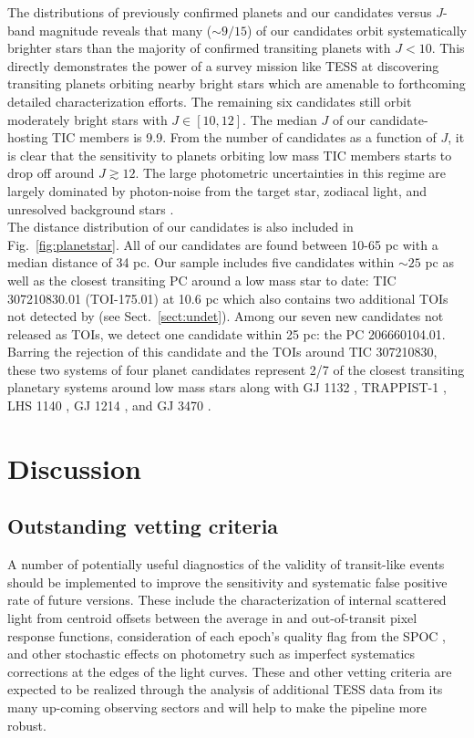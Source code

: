 The distributions of previously confirmed planets
and our candidates versus $J$-band magnitude reveals that many ($\sim 9/15$) of our candidates
orbit systematically brighter stars than the majority of confirmed transiting planets with
$J<10$. This directly demonstrates the power of a survey mission like TESS at discovering
transiting planets orbiting nearby bright stars which are amenable to forthcoming detailed
characterization efforts. The remaining six candidates still orbit moderately
bright stars with $J \in [10,12]$. The median $J$ of our candidate-hosting TIC members is 9.9.
From the number of \pipeline{} candidates as a function of $J$,
it is clear that the \pipeline{} sensitivity to planets orbiting low mass TIC members starts to drop
off around $J \gtrsim 12$.
The large photometric uncertainties in this regime are largely dominated by photon-noise
from the target star, zodiacal light, and unresolved background stars \citep{ricker15}. \\

The distance distribution of our candidates is also included in Fig.~\ref{fig:planetstar}. All of
our candidates are found between 10-65 pc with a median distance of 34 pc. Our sample includes
five candidates within $\sim 25$ pc as well as the closest transiting PC around a low mass star to date:
TIC 307210830.01 (TOI-175.01) at 10.6 pc which also contains two additional TOIs \citep{kostov19}
not detected by \pipeline{} (see Sect.~\ref{sect:undet}). Among our seven new candidates not
released as TOIs, we detect one candidate within 25 pc: the PC 206660104.01.
Barring the rejection of this candidate and the TOIs around TIC 307210830, these two systems of four
planet candidates represent 2/7 of the %
closest transiting planetary systems around low mass stars along with GJ 1132 \citep{berta15,bonfils18},
TRAPPIST-1 \citep{gillon17,luger17}, LHS 1140 \citep{dittmann17a,ment19}, GJ 1214 \citep{charbonneau09}, and
GJ 3470 \citep{bonfils12}.


\section{Discussion} \label{sect:disc}
\subsection{Outstanding vetting criteria} \label{sect:caveats}
A number of potentially useful diagnostics of the validity of transit-like events should be implemented
to improve the sensitivity and systematic false positive rate of future \pipeline{} versions. These include 
the characterization of internal scattered light from centroid offsets between the average in and out-of-transit
pixel response functions, consideration
of each epoch's quality flag from the SPOC \citep{jenkins16},
and other stochastic effects on photometry such as imperfect systematics corrections at the edges of the light
curves. These and other vetting criteria are expected to be realized through the analysis of additional TESS data
from its many up-coming observing sectors and will help to make the \pipeline{} pipeline more robust. 


